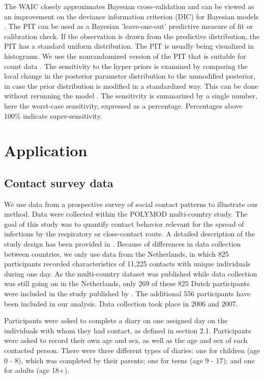 \documentclass[aoas,preprint]{imsart}
\numberwithin{equation}{section}
\begin{document}
The WAIC closely approximates Bayesian cross-validation and can be viewed as an improvement on the deviance information criterion (DIC) for Bayesian models \citep{gelman_understanding_2014}. The PIT can be used as a Bayesian 'leave-one-out' predictive measure of fit or calibration check. If the observation is drawn from the predictive distribution, the PIT has a standard uniform distribution. The PIT is usually being visualized in histograms. We use the nonrandomized version of the PIT that is suitable for count data \citep{czado_predictive_2009}. The sensitivity to the hyper priors is examined by comparing the local change in the posterior parameter distribution to the unmodified posterior, in case the prior distribution is modified in a standardized way. This can be done without rerunning the model \citep{roos_sensitivity_2015}. The sensitivity is summarized by a single number, here the worst-case sensitivity, expressed as a percentage. Percentages above 100\% indicate super-sensitivity.

\section{Application}

\subsection{Contact survey data}

We use data from a prospective survey of social contact patterns to illustrate our method. Data were collected within the POLYMOD multi-country study. The goal of this study was to quantify contact behavior relevant for the spread of infections by the respiratory or close-contact route. A detailed description of the study design has been provided in \cite{mossong_social_2008}. Because of differences in data collection between countries, we only use data from the Netherlands, in which 825 participants recorded characteristics of 11,225 contacts with unique individuals during one day. As the multi-country dataset was published while data collection was still going on in the Netherlands, only 269 of these 825 Dutch participants were included in the study published by \cite{mossong_social_2008}. The additional 556 participants have been included in our analysis. Data collection took place in 2006 and 2007.

Participants were asked to complete a diary on one assigned day on the individuals with whom they had contact, as defined in section 2.1. Participants were asked to record their own age and sex, as well as the age and sex of each contacted person. There were three different types of diaries: one for children (age 0 - 8), which was completed by their parents; one for teens (age 9 - 17); and one for adults (age 18+).
\end{document}
